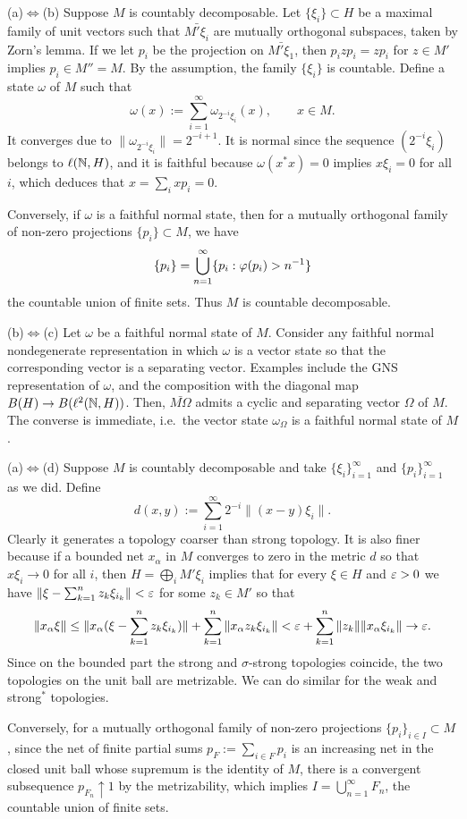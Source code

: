 \documentclass{../../../small}
\begin{document}
\begin{pf}
(a)$\Leftrightarrow$(b)
Suppose $M$ is countably decomposable.
Let $\{\xi_i\}\subset H$ be a maximal family of unit vectors such that $\bar{M'\xi_i}$ are mutually orthogonal subspaces, taken by Zorn's lemma.
If we let $p_i$ be the projection on $\bar{M'\xi_1}$, then $p_izp_i=zp_i$ for $z\in M'$ implies $p_i\in M''=M$.
By the assumption, the family $\{\xi_i\}$ is countable.
Define a state $\omega$ of $M$ such that
\[\omega(x):=\sum_{i=1}^\infty\omega_{2^{-i}\xi_i}(x),\qquad x\in M.\]
It converges due to $\|\omega_{2^{-i}\xi_i}\|=2^{-i+1}$.
It is normal since the sequence $(2^{-i}\xi_i)$ belongs to $\ell(\mathbb{N},H)$, and it is faithful because $\omega(x^*x)=0$ implies $x\xi_i=0$ for all $i$, which deduces that $x=\sum_ixp_i=0$.

Conversely, if $\omega$ is a faithful normal state, then for a mutually orthogonal family of non-zero projections $\{p_i\}\subset M$, we have
\[\{p_i\}=\bigcup_{n=1}^\infty\{p_i:\varphi(p_i)>n^{-1}\}\]
the countable union of finite sets.
Thus $M$ is countable decomposable.

(b)$\Leftrightarrow$(c)
Let $\omega$ be a faithful normal state of $M$.
Consider any faithful normal nondegenerate representation in which $\omega$ is a vector state so that the corresponding vector is a separating vector.
Examples include the GNS representation of $\omega$, and the composition with the diagonal map $B(H)\to B(\ell^2(\mathbb{N},H))$.
Then, $\bar{M\Omega}$ admits a cyclic and separating vector $\Omega$ of $M$.
The converse is immediate, i.e.~the vector state $\omega_\Omega$ is a faithful normal state of $M$.

(a)$\Leftrightarrow$(d)
Suppose $M$ is countably decomposable and take $\{\xi_i\}_{i=1}^\infty$ and $\{p_i\}_{i=1}^\infty$ as we did.
Define
\[d(x,y):=\sum_{i=1}^\infty2^{-i}\|(x-y)\xi_i\|.\]
Clearly it generates a topology coarser than strong topology.
It is also finer because if a bounded net $x_\alpha$ in $M$ converges to zero in the metric $d$ so that $x\xi_i\to0$ for all $i$, then $H=\bigoplus_iM'\xi_i$ implies that for every $\xi\in H$ and $\varepsilon>0$ we have $\|\xi-\sum_{k=1}^nz_k\xi_{i_k}\|<\varepsilon$ for some $z_k\in M'$ so that
\[\|x_\alpha\xi\|\le\|x_\alpha(\xi-\sum_{k=1}^nz_k\xi_{i_k})\|+\sum_{k=1}^n\|x_\alpha z_k\xi_{i_k}\|<\varepsilon+\sum_{k=1}^n\|z_k\|\|x_\alpha\xi_{i_k}\|\to\varepsilon.\]
Since on the bounded part the strong and $\sigma$-strong topologies coincide, the two topologies on the unit ball are metrizable.
We can do similar for the weak and strong$^*$ topologies.

Conversely, for a mutually orthogonal family of non-zero projections $\{p_i\}_{i\in I}\subset M$, since the net of finite partial sums $p_F:=\sum_{i\in F}p_i$ is an increasing net in the closed unit ball whose supremum is the identity of $M$, there is a convergent subsequence $p_{F_n}\uparrow1$ by the metrizability, which implies $I=\bigcup_{n=1}^\infty F_n$, the countable union of finite sets.
\end{pf}
\end{document}
